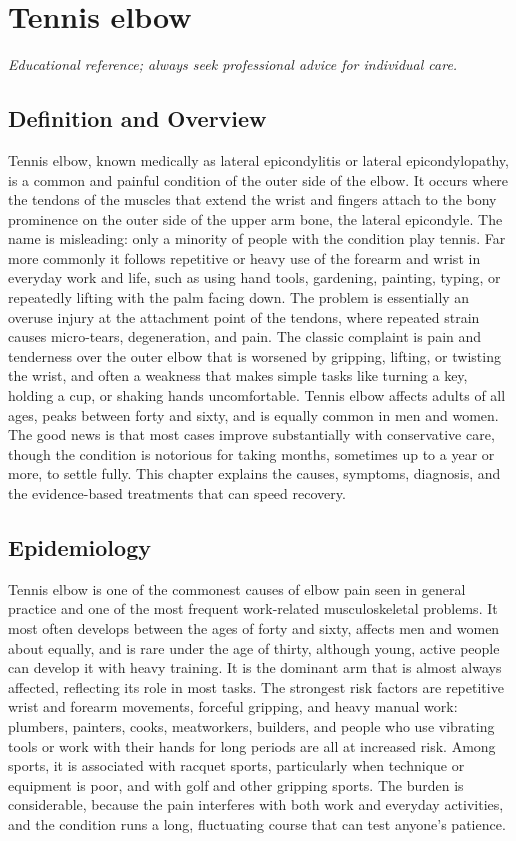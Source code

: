 \chapter{Tennis elbow}

\medskip
\noindent\textit{Educational reference; always seek professional advice for individual care.}

\section*{Definition and Overview}
Tennis elbow, known medically as lateral epicondylitis or lateral epicondylopathy, is a common and painful condition of the outer side of the elbow. It occurs where the tendons of the muscles that extend the wrist and fingers attach to the bony prominence on the outer side of the upper arm bone, the lateral epicondyle. The name is misleading: only a minority of people with the condition play tennis. Far more commonly it follows repetitive or heavy use of the forearm and wrist in everyday work and life, such as using hand tools, gardening, painting, typing, or repeatedly lifting with the palm facing down. The problem is essentially an overuse injury at the attachment point of the tendons, where repeated strain causes micro-tears, degeneration, and pain. The classic complaint is pain and tenderness over the outer elbow that is worsened by gripping, lifting, or twisting the wrist, and often a weakness that makes simple tasks like turning a key, holding a cup, or shaking hands uncomfortable. Tennis elbow affects adults of all ages, peaks between forty and sixty, and is equally common in men and women. The good news is that most cases improve substantially with conservative care, though the condition is notorious for taking months, sometimes up to a year or more, to settle fully. This chapter explains the causes, symptoms, diagnosis, and the evidence-based treatments that can speed recovery.

\section*{Epidemiology}
Tennis elbow is one of the commonest causes of elbow pain seen in general practice and one of the most frequent work-related musculoskeletal problems. It most often develops between the ages of forty and sixty, affects men and women about equally, and is rare under the age of thirty, although young, active people can develop it with heavy training. It is the dominant arm that is almost always affected, reflecting its role in most tasks. The strongest risk factors are repetitive wrist and forearm movements, forceful gripping, and heavy manual work: plumbers, painters, cooks, meatworkers, builders, and people who use vibrating tools or work with their hands for long periods are all at increased risk. Among sports, it is associated with racquet sports, particularly when technique or equipment is poor, and with golf and other gripping sports. The burden is considerable, because the pain interferes with both work and everyday activities, and the condition runs a long, fluctuating course that can test anyone's patience.

